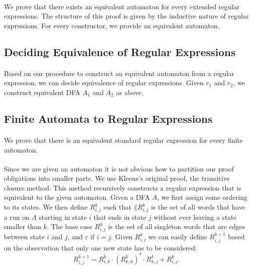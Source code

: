 \documentclass[11pt,a4paper,oneside]{book}
\begin{document}
                \paragraph{} 
                    We prove that there exists an equivalent automaton for every extended regular expressions.
                    The structure of this proof is given by the inductive nature of regular expressions.
                    For every constructor, we provide an equivalent automaton.


            \subsection{Deciding Equivalence of Regular Expressions}

                \paragraph{} 
                    Based on our procedure to construct an equivalent automaton from a regular expression, we can decide equivalence of regular expressions. Given $r_1$ and $r_2$, we construct equivalent DFA $A_1$ and $A_2$ as above.
                    

            \subsection{Finite Automata to Regular Expressions}
                \paragraph{}
                    We prove that there is an equivalent standard regular expression for every finite automaton.

                
                \paragraph{}
                    Since we are given an automaton it is not obvious how to partition our proof obligations into smaller parts.
                    We use Kleene's original proof, the transitive closure method. 
                    This method recursively constructs a regular expression that is equivalent to the given automaton.
                    Given a DFA $A$, we first assign some ordering to its states. We then define $R^k_{i,j}$ such that 
                    $\lang{R^k_{i,j}}$ is the set of all words that have a run on $A$ starting in state $i$ that ends in state $j$ without ever leaving a state smaller than $k$. 
                    The base case $R^{0}_{i,j}$ is the set of all singleton words that are edges between state $i$ and $j$, and $\varepsilon$ if $i=j$. 
                    Given $R^k_{i,j}$ we can easily define $R^{k+1}_{i,j}$ based on the observation that only one new state has to be considered:
                    \[
                        R^{k+1}_{i,j} = R^{k}_{i,k} \cdot (R^{k}_{k,k})^* \cdot R^{k}_{k,j} + R^{k}_{i,j}.
                    \]
\end{document}
